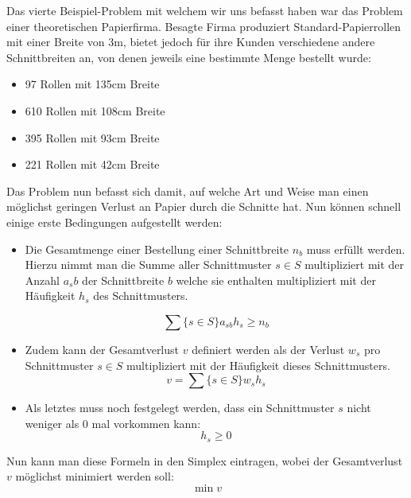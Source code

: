 Das vierte Beispiel-Problem mit welchem wir uns befasst haben war das Problem einer theoretischen Papierfirma. Besagte Firma produziert Standard-Papierrollen mit einer Breite von 3m, bietet jedoch für ihre Kunden verschiedene andere Schnittbreiten an, von denen jeweils eine bestimmte Menge bestellt wurde:
\begin{itemize}
\item 97 Rollen mit 135cm Breite
\item 610  Rollen mit 108cm Breite
\item 395  Rollen mit 93cm Breite
\item 221  Rollen mit 42cm Breite
\end{itemize}

Das Problem nun befasst sich damit, auf welche Art und Weise man einen möglichst geringen Verlust an Papier durch die Schnitte hat.
Nun können schnell einige erste Bedingungen aufgestellt werden:

\begin{itemize}
\item Die Gesamtmenge einer Bestellung einer Schnittbreite $n_b$ muss erfüllt werden. Hierzu nimmt man die Summe aller Schnittmuster $s \in S$ multipliziert mit der Anzahl $a_sb$ der Schnittbreite $b$ welche sie enthalten multipliziert mit der Häufigkeit $h_s$ des Schnittmusters.

\[ \sum\{s \in S\}a_{sb} h_s \geq n_b \]
\item Zudem kann der Gesamtverlust $v$ definiert werden als der Verlust $w_s$ pro Schnittmuster $s \in S$ multipliziert mit der Häufigkeit dieses Schnittmusters.
\[ v = \sum\{s \in S\}w_s h_s  \] 
\item Als letztes muss noch festgelegt werden, dass ein Schnittmuster $s$ nicht weniger als 0 mal vorkommen kann:
\[ h_s \geq 0 \]
\end{itemize}

Nun kann man diese Formeln in den Simplex eintragen, wobei der Gesamtverlust $v$ möglichst minimiert werden soll: 
\[ \min v \] 